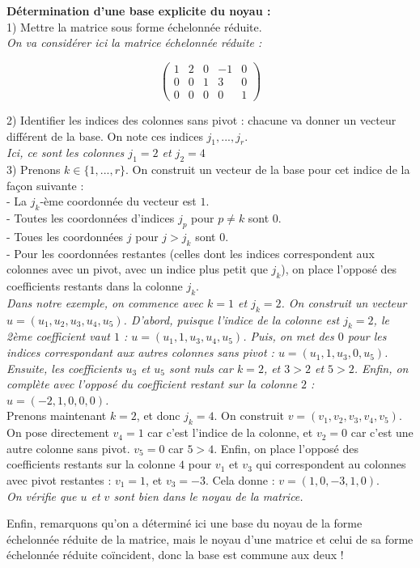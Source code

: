 \documentclass[a4paper,11pt]{article}
\begin{document}
\textbf{Détermination d'une base explicite du noyau :}\\

1) Mettre la matrice sous forme échelonnée réduite.\\

\textit{On va considérer ici la matrice échelonnée réduite : }

$$\begin{pmatrix}
    1&2&0&-1&0\\
    0 &0&1&3&0\\
    0&0&0&0&1
\end{pmatrix}$$

2) Identifier les indices des colonnes sans pivot : chacune va donner un vecteur différent de la base. On note ces indices $j_1,...,j_r$.\\

\textit{Ici, ce sont les colonnes $j_1 = 2$ et $j_2 = 4$}\\

3) Prenons $k\in\{1,...,r\}$. On construit un vecteur de la base pour cet indice de la façon suivante :\\
- La $j_k$-ème coordonnée du vecteur est $1$. \\
- Toutes les coordonnées d'indices $j_p$ pour $p\neq k$ sont $0$.\\
- Toues les coordonnées $j $ pour $j> j_k$ sont $0$.\\
- Pour les coordonnées restantes (celles dont les indices correspondent aux colonnes avec un pivot, avec un indice plus petit que $j_k$), on place l'opposé des coefficients restants dans la colonne $j_k$. \\ 



\textit{Dans notre exemple, on commence avec $k = 1$ et $j_k = 2$. On construit un vecteur $u = (u_1,u_2,u_3,u_4,u_5)$. D'abord, puisque l'indice de la colonne est $j_k =2$, le 2ème coefficient vaut $1$ : $u = (u_1,1,u_3,u_4,u_5)$. Puis, on met des $0$ pour les indices correspondant aux autres colonnes sans pivot : $u = (u_1,1,u_3,0,u_5)$. Ensuite, les coefficients $u_3$ et $u_5$ sont nuls car $k = 2$, et $3> 2$ et $5 > 2$. Enfin, on complète avec l'opposé du coefficient restant sur la colonne $2$ : $u = (-2,1,0,0,0)$. 
}\\

Prenons maintenant $k = 2$, et donc $j_k = 4$. On construit $v = (v_1,v_2,v_3,v_4,v_5)$. On pose directement $v_4 = 1$ car c'est l'indice de la colonne, et $v_2 = 0$ car c'est une autre colonne sans pivot. $v_5 = 0$ car $5> 4$. Enfin, on place l'opposé des coefficients restants sur la colonne $4$ pour $v_1$ et $v_3$ qui correspondent au colonnes avec pivot restantes : $v_1 = 1$, et $v_3 = -3$. Cela donne : $v = (1,0,-3,1,0)$.\\

\textit{On vérifie que $u$ et $v$ sont bien dans le noyau de la matrice. \\}






Enfin, remarquons qu'on a déterminé ici une base du noyau de la forme échelonnée réduite de la matrice, mais le noyau d'une matrice et celui de sa forme échelonnée réduite coïncident, donc la base est commune aux deux !
\end{document}
